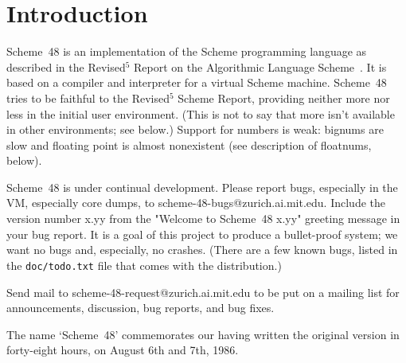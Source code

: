 
\chapter{Introduction}

Scheme~48 is an implementation of the Scheme programming language as
described in the Revised$^5$ Report on the Algorithmic Language
 Scheme~\cite{R5RS}.
It is based on a compiler and interpreter for a virtual Scheme
machine.  Scheme~48 tries to be faithful to the Revised$^5$ Scheme
Report, providing neither more nor less in the initial user
environment.  (This is not to say that more isn't available in other
environments; see below.)  Support for numbers is weak: bignums are
slow and floating point is almost nonexistent (see description of
floatnums, below).


Scheme~48 is under continual development.
Please report bugs, especially in the VM, especially core dumps, to
scheme-48-bugs@zurich.ai.mit.edu.  Include the version number x.yy
from the "Welcome to Scheme~48 x.yy" greeting message in your bug
report.  It is a goal of this project to produce a bullet-proof
system; we want no bugs and, especially, no crashes.  (There are a few
known bugs, listed in the {\tt doc/todo.txt} file that comes with the
distribution.)

Send mail to scheme-48-request@zurich.ai.mit.edu to be put on a
mailing list for announcements, discussion, bug reports, and bug
fixes.

The name `Scheme~48' commemorates our having written the original version
 in forty-eight hours, on August 6th and 7th, 1986.

